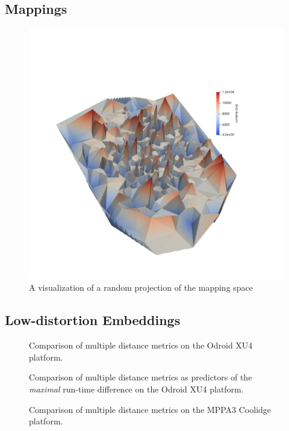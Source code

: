 \subsection{Mappings}
\begin{figure}[h]
	\centering
\includegraphics[width=\textwidth]{figures/coolidge-af-space3.png}
	\caption{A visualization of a random projection of the mapping space}
	\label{fig:mapping_space}
\end{figure}

\subsection{Low-distortion Embeddings}

\begin{figure}[h]
	\centering
	\caption{Comparison of multiple distance metrics on the Odroid XU4 platform.}
	\label{fig:metric_comparison}
\end{figure}

\begin{figure}[h]
	\centering
	\caption{Comparison of multiple distance metrics as predictors of the \emph{maximal} run-time difference on the Odroid XU4 platform.}
	\label{fig:metric_comparison_max}
\end{figure}
\begin{figure}[h]
	\centering
	\caption{Comparison of multiple distance metrics on the MPPA3 Coolidge platform.}
	\label{fig:metric_comparison}
\end{figure}

